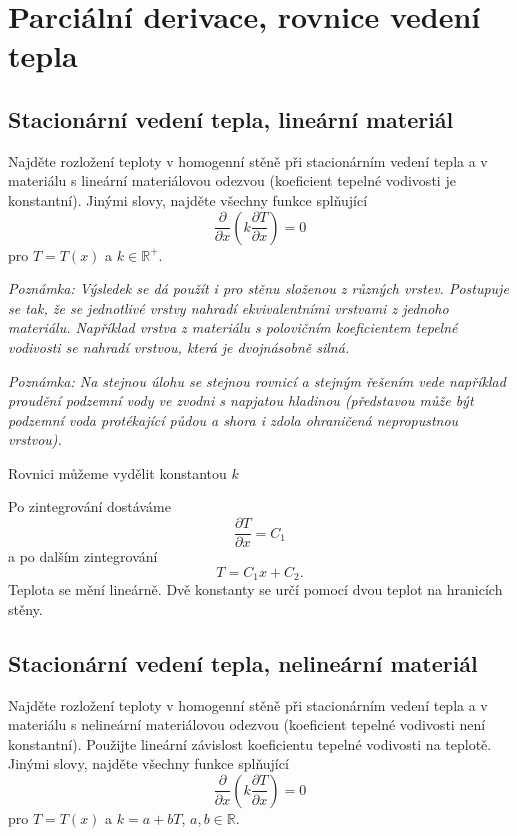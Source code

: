 \konec



\stranka
\section{Parciální derivace, rovnice vedení tepla}

\stranka
\subsection{Stacionární vedení tepla, lineární materiál}

Najděte rozložení teploty v homogenní stěně při stacionárním vedení tepla a v materiálu s lineární materiálovou odezvou (koeficient tepelné vodivosti je konstantní).
Jinými slovy, najděte všechny funkce splňující
$$\frac{\partial}{\partial x} \left(k \frac{\partial T}{\partial x}\right)=0$$
pro $T=T(x)$ a $k\in \mathbb R^+$.

\textit{Poznámka: Výsledek se dá použít i pro stěnu složenou z různých vrstev. Postupuje se tak, že se jednotlivé vrstvy nahradí ekvivalentními vrstvami z jednoho materiálu. Například vrstva z materiálu s polovičním koeficientem tepelné vodivosti se nahradí vrstvou, která je dvojnásobně silná.}

\textit{Poznámka: Na stejnou úlohu se stejnou rovnicí a stejným řešením vede například proudění podzemní vody ve zvodni s napjatou hladinou (představou může být podzemní voda protékající půdou a shora i zdola ohraničená nepropustnou vrstvou).}

\reseni

Rovnici můžeme vydělit konstantou $k$

Po zintegrování dostáváme $$ \frac{\partial T}{\partial x}=C_1$$
a po dalším zintegrování $$T=C_1x+C_2.$$ Teplota se mění lineárně. Dvě konstanty se určí pomocí dvou teplot na hranicích stěny.

\konec

\stranka
\subsection{Stacionární vedení tepla, nelineární materiál}


Najděte rozložení teploty v homogenní stěně při stacionárním vedení
tepla a v materiálu s nelineární materiálovou odezvou (koeficient
tepelné vodivosti není konstantní).  Použijte lineární závislost
koeficientu tepelné vodivosti na teplotě.  Jinými slovy, najděte
všechny funkce splňující
$$\frac{\partial}{\partial x} \left(k \frac{\partial T}{\partial x}\right)=0$$
pro $T=T(x)$ a $k=a+bT$, $a,b\in \mathbb R$.

